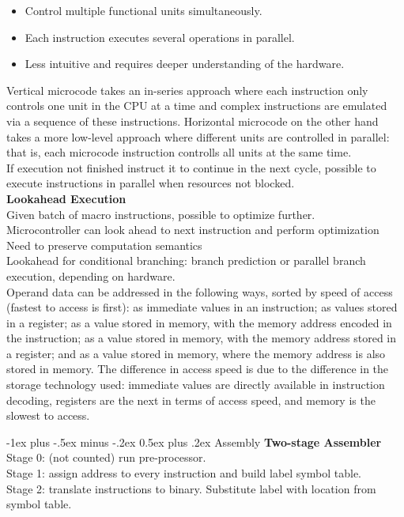 \documentclass[letterpaper, 8pt]{extarticle}
\makeatletter
\renewcommand{\section}{\@startsection{section}{1}{0mm}%
                                {-1ex plus -.5ex minus -.2ex}%
                                {0.5ex plus .2ex}%
                                {\normalfont\normalsize\bfseries}}
\makeatother
\begin{document}
\begin{multicols*}{6}
	\begin{itemize}
	\item Control multiple functional units simultaneously.
	\item Each instruction executes several operations in parallel.
	\item Less intuitive and requires deeper understanding of the hardware.
	\end{itemize}
	Vertical microcode takes an in-series approach where each instruction only controls one unit in the CPU at a time and complex instructions are emulated via a sequence of these instructions. Horizontal microcode on the other hand takes a more low-level approach where different units are controlled in parallel: that is, each microcode instruction controlls all units at the same time.\\
	If execution not finished instruct it to continue in the next cycle, possible to execute instructions in parallel when resources not blocked.\\
	\textbf{Lookahead Execution}\\
	Given batch of macro instructions, possible to optimize further. \\
	Microcontroller can look ahead to next instruction and perform optimization Need to preserve computation semantics\\
	Lookahead for conditional branching: branch prediction or parallel branch execution, depending on hardware.\\
	Operand data can be addressed in the following ways, sorted by speed of access (fastest to access is first): as immediate values in an instruction; as values stored in a register; as a value stored in memory, with the memory address encoded in the instruction; as a value stored in memory, with the memory address stored in a register; and as a value stored in memory, where the memory address is also stored in memory. The difference in access speed is due to the difference in the storage technology used: immediate values are directly available in instruction decoding, registers are the next in terms of access speed, and memory is the slowest to access.

    \section{Assembly}
	\textbf{Two-stage Assembler}\\
	Stage 0: (not counted) run pre-processor.\\
	Stage 1: assign address to every instruction and build label symbol table.\\
	Stage 2: translate instructions to binary. Substitute label with location from symbol table.\\

\end{multicols*}
\end{document}
